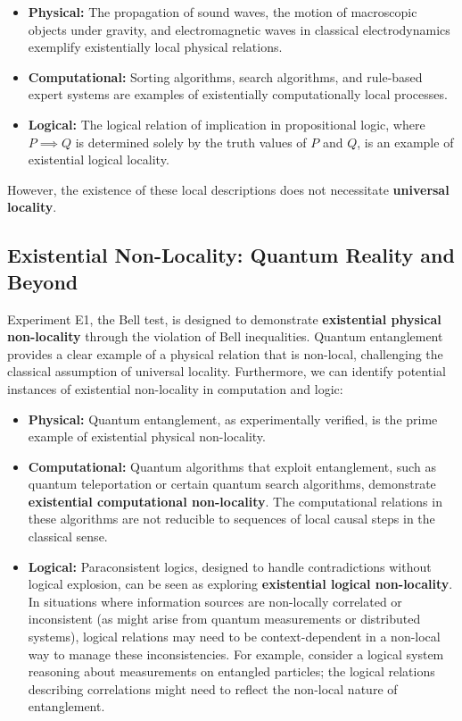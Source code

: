 	\begin{itemize}
		\item \textbf{Physical:}  The propagation of sound waves, the motion of macroscopic objects under gravity, and electromagnetic waves in classical electrodynamics exemplify existentially local physical relations.
		\item \textbf{Computational:}  Sorting algorithms, search algorithms, and rule-based expert systems are examples of existentially computationally local processes.
		\item \textbf{Logical:}  The logical relation of implication in propositional logic, where $P \implies Q$ is determined solely by the truth values of $P$ and $Q$, is an example of existential logical locality.
	\end{itemize}
	However, the existence of these local descriptions does not necessitate \textbf{universal locality}.
	
	\subsection{Existential Non-Locality: Quantum Reality and Beyond}
	
	Experiment E1, the Bell test, is designed to demonstrate \textbf{existential physical non-locality} through the violation of Bell inequalities.  Quantum entanglement provides a clear example of a physical relation that is non-local, challenging the classical assumption of universal locality.  Furthermore, we can identify potential instances of existential non-locality in computation and logic:
	
	\begin{itemize}
		\item \textbf{Physical:} Quantum entanglement, as experimentally verified, is the prime example of existential physical non-locality.
		\item \textbf{Computational:} Quantum algorithms that exploit entanglement, such as quantum teleportation or certain quantum search algorithms, demonstrate \textbf{existential computational non-locality}. The computational relations in these algorithms are not reducible to sequences of local causal steps in the classical sense.
		\item \textbf{Logical:} Paraconsistent logics, designed to handle contradictions without logical explosion, can be seen as exploring \textbf{existential logical non-locality}.  In situations where information sources are non-locally correlated or inconsistent (as might arise from quantum measurements or distributed systems), logical relations may need to be context-dependent in a non-local way to manage these inconsistencies. For example, consider a logical system reasoning about measurements on entangled particles; the logical relations describing correlations might need to reflect the non-local nature of entanglement.
	\end{itemize}
	
